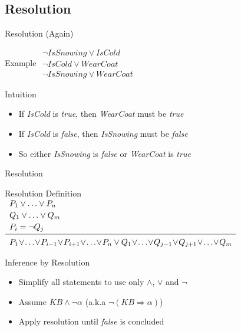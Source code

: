 \documentclass[14pt]{beamer}
\newcommand{\limpl}{\Rightarrow}
\begin{document}
\subsection{Resolution}
\begin{frame}{Resolution (Again)}
	\begin{block}{Example}
		$
		\begin{array}{l}
		\lnot \textit{IsSnowing} \lor \textit{IsCold} \\
		\lnot \textit{IsCold} \lor \textit{WearCoat} \\
		\hline
		\lnot \textit{IsSnowing} \lor \textit{WearCoat}
		\end{array}
		$
	\end{block}
	\begin{block}{Intuition}
		\begin{itemize}
			\item If \textit{IsCold} is \emph{true}, then \textit{WearCoat} must be \emph{true}
			\item If \textit{IsCold} is \emph{false}, then \textit{IsSnowing} must be \emph{false}
			\item So either \textit{IsSnowing} is \emph{false} or \textit{WearCoat} is \emph{true}
		\end{itemize}
	\end{block}
\end{frame}
\begin{frame}{Resolution}
	\begin{block}{Resolution Definition}
	\small
	$
	\begin{array}{l}
		P_1 \lor \ldots \lor P_n \\[.2em]
		Q_1 \lor \ldots \lor Q_m \\[.2em]
		P_i = \lnot Q_j \\[.2em]
		\hline
		\\[-.8em]
		P_1 \!\lor\! \ldots \!\lor\! P_{i-1} \!\lor\! P_{i+1} \!\lor\! \ldots \!\lor\! P_n
		\lor
		Q_1 \!\lor\! \ldots \!\lor\! Q_{j-1} \!\lor\! Q_{j+1} \!\lor\! \ldots \!\lor\! Q_m
	\end{array}
	$
	\end{block}
	\begin{block}{Inference by Resolution}
		\begin{itemize}
			\item Simplify all statements to use only $\land$, $\lor$ and $\lnot$
			\item Assume $\textit{KB} \land \lnot\alpha$ (a.k.a $\lnot (\textit{KB} \limpl \alpha)$)
			\item Apply resolution until \emph{false} is concluded
		\end{itemize}
	\end{block}
\end{frame}
\end{document}
